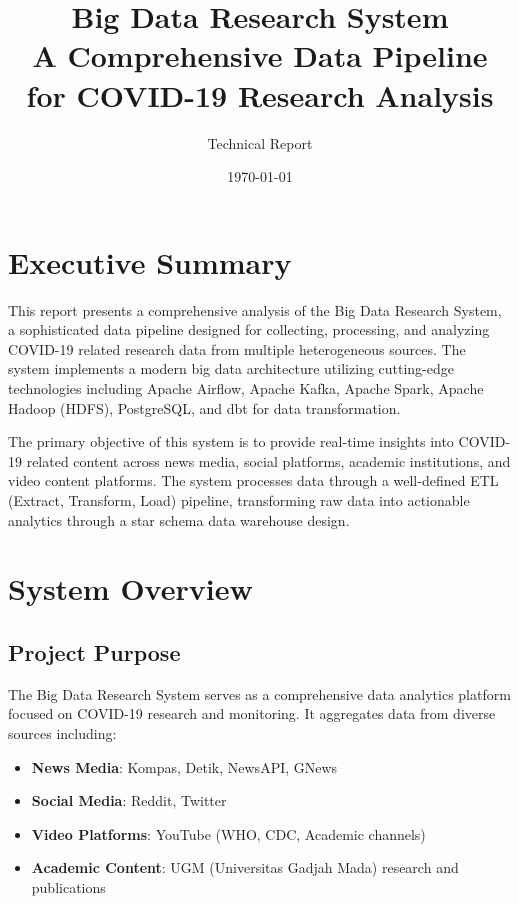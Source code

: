 \documentclass[12pt,a4paper]{article}
\title{\Huge\textbf{Big Data Research System}\\[0.5cm]
\Large A Comprehensive Data Pipeline for COVID-19 Research Analysis}
\author{Technical Report}
\date{\today}
\begin{document}
\maketitle
\thispagestyle{empty}

\newpage
\tableofcontents
\newpage

\section{Executive Summary}

This report presents a comprehensive analysis of the Big Data Research System, a sophisticated data pipeline designed for collecting, processing, and analyzing COVID-19 related research data from multiple heterogeneous sources. The system implements a modern big data architecture utilizing cutting-edge technologies including Apache Airflow, Apache Kafka, Apache Spark, Apache Hadoop (HDFS), PostgreSQL, and dbt for data transformation.

The primary objective of this system is to provide real-time insights into COVID-19 related content across news media, social platforms, academic institutions, and video content platforms. The system processes data through a well-defined ETL (Extract, Transform, Load) pipeline, transforming raw data into actionable analytics through a star schema data warehouse design.

\section{System Overview}

\subsection{Project Purpose}
The Big Data Research System serves as a comprehensive data analytics platform focused on COVID-19 research and monitoring. It aggregates data from diverse sources including:

\begin{itemize}
    \item \textbf{News Media}: Kompas, Detik, NewsAPI, GNews
    \item \textbf{Social Media}: Reddit, Twitter
    \item \textbf{Video Platforms}: YouTube (WHO, CDC, Academic channels)
    \item \textbf{Academic Content}: UGM (Universitas Gadjah Mada) research and publications
\end{itemize}
\end{document}
